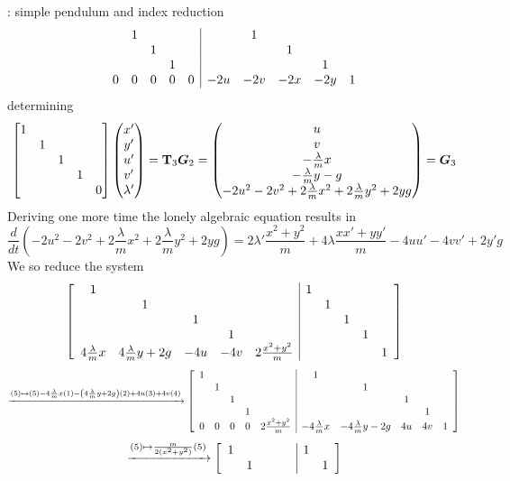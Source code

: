 \begin{example}{: simple pendulum and index reduction}
\[{\begin{array} {ccccc | ccccc}
				& 1 &&&&& 1 \\ 
				&& 1 &&&&& 1 \\ 
				&&& 1 &&&&& 1 \\ 
				0 & 0 & 0 & 0 & 0 &-2u& -2v & -2x & -2y & 1
		\end{array}} \]
		determining
		\[ \begin{bmatrix}  1  \\ & 1 \\ && 1 \\ &&& 1 \\ &&&& 0  \end{bmatrix} \begin{pmatrix} x' \\ y' \\ u' \\ v' \\ \lambda' \end{pmatrix} = \mathbf{T}_3 \boldsymbol{G}_2 = \begin{pmatrix} u \\ v \\ - \frac \lambda m x \\ -\frac \lambda m  y - g \\ -2u^2 - 2v^2 +2 \frac \lambda m x^2 + 2 \frac \lambda m y^2 +2 yg \end{pmatrix} = \boldsymbol{G}_3 \]
		Deriving one more time the lonely algebraic equation results in
		\[ \frac d{dt} \left( -2u^2 - 2v^2 +2 \frac \lambda m x^2 + 2 \frac \lambda m y^2 +2 yg \right) = 2 \lambda' \frac{x^2 + y^2}{m} + 4\lambda \frac{x x' + yy'}{m} -4 uu' - 4 vv' +2y'g \]
		We so reduce the system
		\[ \begin{bmatrix} \begin{array} {ccccc | ccccc}
				1   &&&&& 1 \\ 
				& 1 &&&&& 1 \\ 
				&& 1 &&&&& 1 \\ 
				&&& 1 &&&&& 1 \\ 
				4\frac \lambda m x & 4 \frac \lambda m y + 2g & -4u & -4v & 2\frac{x^2+y^2}{m} &&&&& 1
		\end{array} \end{bmatrix} \]
		\[ \xrightarrow{(5) \mapsto (5) - 4\frac \lambda m x  (1) - \left(4 \frac \lambda m y + 2g \right) (2) +4u (3) +4v(4)}\begin{bmatrix} \begin{array} {ccccc | ccccc}
				1 &&&&& 1 \\ 
				& 1 &&&&& 1 \\ 
				&& 1 &&&&& 1 \\ 
				&&& 1 &&&&& 1 \\ 
				0 & 0 & 0 & 0 & 2\frac{x^2+y^2}{m} & - 4\frac \lambda m x & - 4 \frac \lambda m y - 2g &  4u & 4v & 1
		\end{array} \end{bmatrix} \]
		\[ \xrightarrow{(5) \mapsto \frac m{2(x^2+y^2)}(5)}\begin{bmatrix} \begin{array} {ccccc | ccccc}
			1 &&&&& 1 \\ 
			& 1 &&&&& 1 \\ 

\end{array} \end{bmatrix}\]
\end{example}
